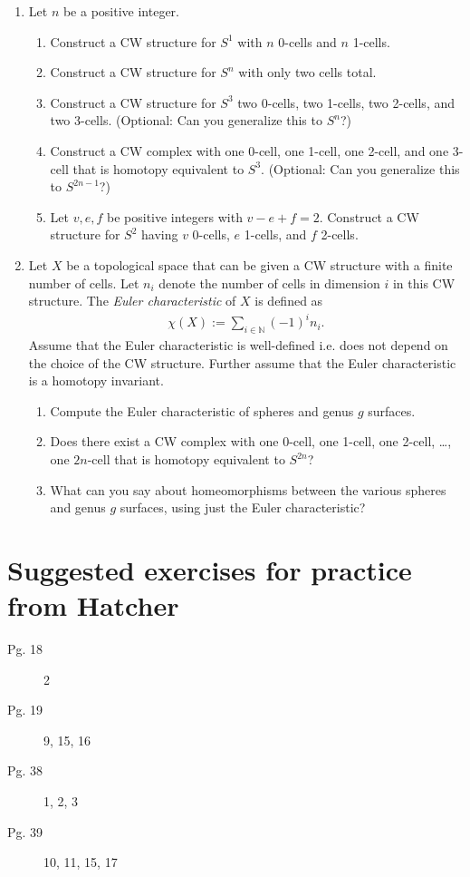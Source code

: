 \documentclass{article}
\begin{document}
\begin{enumerate}[resume]
    \item 
    Let $n$ be a positive integer. 
        \begin{enumerate}
            \item Construct a CW structure for $S^1$ with $n$ 0-cells and $n$ 1-cells. 
            \item Construct a CW structure for $S^n$ with only two cells total.
            \item Construct a CW structure for $S^3$ two 0-cells, two 1-cells, two 2-cells, and two 3-cells. (Optional: Can you generalize this to $S^{n}$?)
            \item Construct a CW complex with one 0-cell, one 1-cell, one 2-cell, and one 3-cell that is homotopy equivalent to $S^3$. (Optional: Can you generalize this to $S^{2n-1}$?)
            \item Let $v, e, f$ be positive integers with $v - e + f = 2$. Construct a CW structure for $S^2$ having $v$ 0-cells, $e$ 1-cells, and $f$ 2-cells.
        \end{enumerate}
    
    \item 
    Let $X$ be a topological space that can be given a CW structure with a finite number of cells. Let $n_i$ denote the number of cells in dimension $i$ in this CW structure. The \emph{Euler characteristic} of $X$ is defined as 
    \begin{align*}
        \chi(X) := \sum_{i \in \mathbb{N}} (-1)^i n_i.
    \end{align*}
    Assume that the Euler characteristic is well-defined i.e. does not depend on the choice of the CW structure. Further assume that the Euler characteristic is a homotopy invariant. 

    \begin{enumerate}
        \item Compute the Euler characteristic of spheres and genus $g$ surfaces. 
        \item Does there exist a CW complex with one 0-cell, one 1-cell, one 2-cell, \dots, one $2n$-cell that is homotopy equivalent to $S^{2n}$? 
        \item What can you say about homeomorphisms between the various spheres and genus $g$ surfaces, using just the Euler characteristic?
    \end{enumerate}
    
\end{enumerate}


\section*{Suggested exercises for practice from Hatcher}

\begin{description}
    \item[Pg. 18] 2
    \item[Pg. 19] 9, 15, 16
    \item[Pg. 38] 1, 2, 3
    \item[Pg. 39] 10, 11, 15, 17
\end{description}
\end{document}
